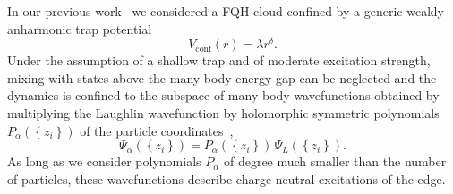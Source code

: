 \documentclass[twocolumn,pra,superscriptaddress,noshowpacs]{revtex4}
\begin{document}
In our previous work~\cite{Nardin_PRA_2023} we considered a FQH cloud confined by a generic weakly anharmonic trap potential 
\begin{equation}
\label{eq:trap}
V_\text{conf}(r)=\lambda r^\delta.
\end{equation}
Under the assumption of a shallow trap and of moderate excitation strength, mixing with states above the many-body energy gap can be neglected and the dynamics is confined to the subspace of many-body wavefunctions obtained by multiplying the Laughlin wavefunction by holomorphic symmetric polynomials $P_{\alpha}\left(\left\{z_i\right\}\right)$ of the particle coordinates~\cite{Stone_PRB_1990,Wen_AdvPhys_1995,SimonWavefunctionology_2020},
    \begin{equation}
        \label{eq:laughlinEdge}
        \Psi_\alpha(\left\{z_i\right\}) = P_{\alpha}\left(\left\{z_i\right\}\right)\,\Psi_L(\left\{z_i\right\}).
\end{equation}
As long as we consider polynomials $P_{\alpha}$ of degree much smaller than the number of particles, these wavefunctions describe charge neutral excitations of the edge.
\end{document}

